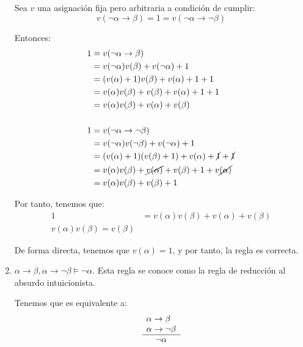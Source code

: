 \begin{ejercicio*}
\begin{enumerate}
        Sea $v$ una asignación fija pero arbitraria a condición de cumplir:
        \begin{equation*}
            v(\lnot\alpha\rightarrow\beta)=1=v(\lnot\alpha\rightarrow\lnot\beta)
        \end{equation*}

        Entonces:
        \begin{align*}
            1 &= v(\lnot\alpha\rightarrow\beta)\\
            &= v(\lnot\alpha)v(\beta)+v(\lnot\alpha)+1\\
            &= (v(\alpha)+1)v(\beta)+v(\alpha)+1+1\\
            &= v(\alpha)v(\beta)+v(\beta)+v(\alpha)+1+1\\
            &= v(\alpha)v(\beta)+v(\alpha)+v(\beta)\\ \\
            1 &= v(\lnot\alpha\rightarrow\lnot\beta)\\
            &= v(\lnot\alpha)v(\lnot\beta)+v(\lnot\alpha)+1\\
            &= (v(\alpha)+1)(v(\beta)+1)+v(\alpha)+\cancel{1}+\cancel{1}\\
            &= v(\alpha)v(\beta)+\cancel{v(\alpha)}+v(\beta)+1+v\cancel{(\alpha)}\\
            &= v(\alpha)v(\beta)+v(\beta)+1
        \end{align*}

        Por tanto, tenemos que:
        \begin{align*}
            1 &= v(\alpha)v(\beta)+v(\alpha)+v(\beta)\\
            v(\alpha)v(\beta) = v(\beta)
        \end{align*}

        De forma directa, tenemos que $v(\alpha)=1$, y por tanto, la regla es correcta.

        \item $\alpha\rightarrow\beta,\alpha\rightarrow\lnot\beta\vDash\lnot\alpha$. Esta regla se conoce como la regla de reducción al absurdo intuicionista.
        
        Tenemos que es equivalente a:
        \begin{equation*}
            \begin{array}{l}
                \alpha\rightarrow\beta\\
                \alpha\rightarrow\lnot\beta\\ \hline
                \multicolumn{1}{c}{\lnot\alpha}
            \end{array}
        \end{equation*}


\end{enumerate}
\end{ejercicio*}
